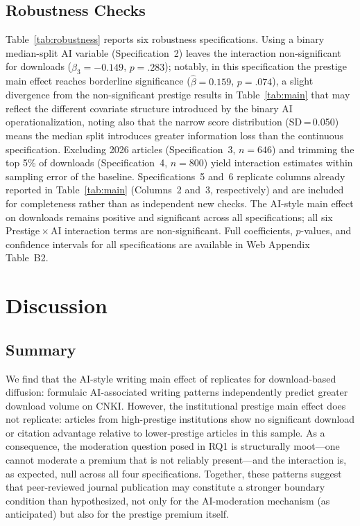 \documentclass[12pt,a4paper]{article}
\begin{document}
\subsection{Robustness Checks}

Table~\ref{tab:robustness} reports six robustness specifications.
Using a binary median-split AI variable (Specification~2) leaves
the interaction non-significant for downloads
($\hat{\beta}_3 = -0.149$, $p=.283$); notably, in this specification
the prestige main effect reaches borderline significance
($\hat{\beta} = 0.159$, $p=.074$), a slight divergence from the
non-significant prestige results in Table~\ref{tab:main} that may
reflect the different covariate structure introduced by the binary AI
operationalization, noting also that the narrow score distribution
(SD\,=\,0.050) means the median split introduces greater information loss
than the continuous specification.
Excluding 2026 articles (Specification~3, $n = 646$) and trimming the
top 5\% of downloads (Specification~4, $n = 800$) yield interaction
estimates within sampling error of the baseline.
Specifications~5 and~6 replicate columns already reported in
Table~\ref{tab:main} (Columns~2 and~3, respectively) and are included
for completeness rather than as independent new checks.
The AI-style main effect on downloads remains positive and significant
across all specifications; all six Prestige\,$\times$\,AI interaction
terms are non-significant.
Full coefficients, $p$-values, and confidence intervals for all
specifications are available in Web Appendix Table~B2.

\section{Discussion}
\label{sec:discussion}

\subsection{Summary}

We find that the AI-style writing main effect of \citet{JoLi2026}
replicates for download-based diffusion: formulaic AI-associated
writing patterns independently predict greater download volume on CNKI.
However, the institutional prestige main effect does not replicate:
articles from high-prestige institutions show no significant download
or citation advantage relative to lower-prestige articles in this sample.
As a consequence, the moderation question posed in RQ1 is structurally
moot---one cannot moderate a premium that is not reliably present---and
the interaction is, as expected, null across all four specifications.
Together, these patterns suggest that peer-reviewed journal publication
may constitute a stronger boundary condition than hypothesized, not only
for the AI-moderation mechanism (as anticipated) but also for the
prestige premium itself.
\end{document}
